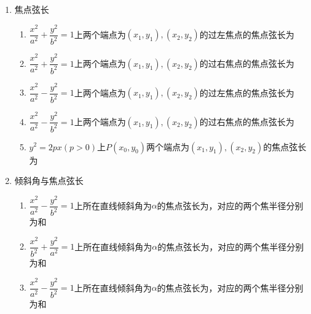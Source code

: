 \begin{enumerate}
\begin{enumerate}
        \item $-\dfrac{x^2}{b^2}+\dfrac{y^2}{a^2} = 1$上支上点$P(x_0, y_0)$到下焦点$F(0, -c)$的距离为
        \item $-\dfrac{x^2}{b^2}+\dfrac{y^2}{a^2} = 1$下支上点$P(x_0, y_0)$到上焦点$F(0, c)$的距离为
        \item $y^2 = 2px(p>0)$上$P(x_0, y_0)$到焦点$F\left(\dfrac{p}{2}, 0\right)$的距离为
        \item $x^2 = 2py(p>0)$上$P(x_0, y_0)$到焦点$F\left(0, \dfrac{p}{2}\right)$的距离为
    \end{enumerate}
    \item 焦点弦长
    \begin{enumerate}
        \item $\dfrac{x^2}{a^2}+\dfrac{y^2}{b^2} = 1$上两个端点为$(x_1, y_1), (x_2, y_2)$的过左焦点的焦点弦长为
        \item $\dfrac{x^2}{a^2}+\dfrac{y^2}{b^2} = 1$上两个端点为$(x_1, y_1), (x_2, y_2)$的过右焦点的焦点弦长为
        \item $\dfrac{x^2}{a^2}-\dfrac{y^2}{b^2} = 1$上两个端点为$(x_1, y_1), (x_2, y_2)$的过左焦点的焦点弦长为
        \item $\dfrac{x^2}{a^2}-\dfrac{y^2}{b^2} = 1$上两个端点为$(x_1, y_1), (x_2, y_2)$的过右焦点的焦点弦长为
        \item $y^2 = 2px(p>0)$上$P(x_0, y_0)$两个端点为$(x_1, y_1), (x_2, y_2)$的焦点弦长为
    \end{enumerate}
    \item 倾斜角与焦点弦长
    \begin{enumerate}
        \item $\dfrac{x^2}{a^2}-\dfrac{y^2}{b^2} = 1$上所在直线倾斜角为$\alpha$的焦点弦长为，对应的两个焦半径分别为和
        \item $\dfrac{x^2}{b^2}+\dfrac{y^2}{a^2} = 1$上所在直线倾斜角为$\alpha$的焦点弦长为，对应的两个焦半径分别为和
        \item $\dfrac{x^2}{a^2}-\dfrac{y^2}{b^2} = 1$上所在直线倾斜角为$\alpha$的焦点弦长为，对应的两个焦半径分别为和

\end{enumerate}
\end{enumerate}
